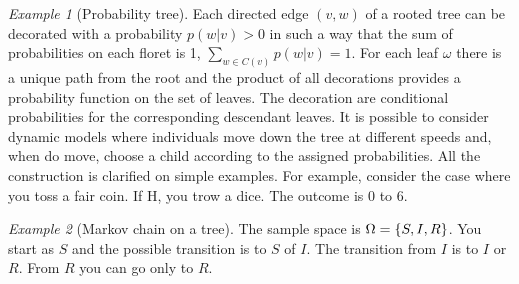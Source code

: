 \documentclass[12pt,a4paper]{amsart}
\theoremstyle{plain}%
\theoremstyle{definition}
\theoremstyle{remark}
\newtheorem{example}{Example}
\begin{document}
\begin{example}[Probability tree]
Each directed edge $(v,w)$ of a rooted tree can be decorated with a probability $p(w|v) > 0$ in such a way that the sum of probabilities on each floret is 1, $\sum_{w \in C(v)} p(w|v) = 1$. For each leaf $\omega$ there is a unique path from the root and the product of all decorations provides a probability function on the set of leaves. The decoration are conditional probabilities for the corresponding descendant leaves. It is possible to consider dynamic models where individuals move down the tree at different speeds and, when do move, choose a child according to the assigned probabilities. All the construction is clarified on simple examples. For example, consider the case where you toss a fair coin. If H, you trow a dice. The outcome is 0 to 6. 
\end{example}

\begin{example}[Markov chain on a tree] The sample space is $\Omega=\left\{S,I,R\right\}$. You start as $S$ and the possible transition is to $S$ of $I$. The transition from $I$ is to $I$ or $R$. From $R$ you can go only to $R$.
\end{example}
\end{document}
